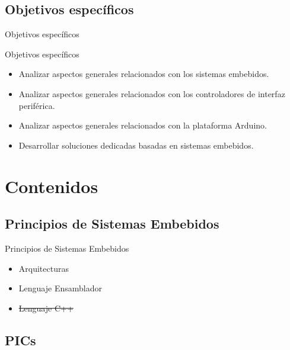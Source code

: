\documentclass[handout,xcolor=dvipsnames]{beamer}
\newcommand{\pageframe}[1]{\frame{\begin{center}{ \Huge #1 }\end{center}}}
\begin{document}
\subsection{Objetivos específicos}

\begin{frame}{Objetivos específicos}
  \begin{block}{Objetivos específicos}
    \begin{itemize}
      \item<1> Analizar aspectos generales relacionados con los sistemas embebidos.
      \item<1> Analizar aspectos generales relacionados con los controladores de interfaz periférica.
      \item<1> Analizar aspectos generales relacionados con la plataforma Arduino.
      \item<1> Desarrollar soluciones dedicadas basadas en sistemas embebidos.
    \end{itemize}
  \end{block}
\end{frame}


\section{Contenidos}

\pageframe{Contenidos}

\subsection[Principios]{Principios de Sistemas Embebidos}

\begin{frame}{Principios de Sistemas Embebidos}
  \begin{block}{}
  \begin{itemize}
    \item Arquitecturas
    \item Lenguaje Ensamblador
    \item \sout{Lenguaje C++}
  \end{itemize}
  \end{block}
\end{frame}

\subsection[PICs]{PICs}
\end{document}
